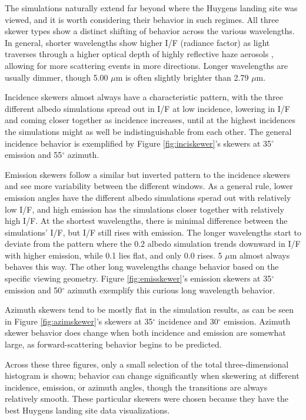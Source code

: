 \documentclass[twocolumn,linenumbers]{aastex631}
\begin{document}
The simulations naturally extend far beyond where the Huygens landing site was viewed, and it is worth considering their behavior in such regimes. All three skewer types show a distinct shifting of behavior across the various wavelengths. In general, shorter wavelengths show higher I/F (radiance factor) as light traverses through a higher optical depth of highly reflective haze aerosols \citep{EsSayeh2023}, allowing for more scattering events in more directions. Longer wavelengths are usually dimmer, though 5.00 $\mu$m is often slightly brighter than 2.79 $\mu$m.

Incidence skewers almost always have a characteristic pattern, with the three different albedo simulations spread out in I/F at low incidence, lowering in I/F and coming closer together as incidence increases, until at the highest incidences the simulations might as well be indistinguishable from each other. The general incidence behavior is exemplified by Figure \ref{fig:inciskewer}'s skewers at 35$^{\circ}$ emission and 55$^{\circ}$ azimuth.

Emission skewers follow a similar but inverted pattern to the incidence skewers and see more variability between the different windows. As a general rule, lower emission angles have the different albedo simulations sperad out with relatively low I/F, and high emission has the simulations closer together with relatively high I/F. At the shortest wavelengths, there is minimal difference between the simulations' I/F, but I/F still rises with emission. The longer wavelengths start to deviate from the pattern where the 0.2 albedo simulation trends downward in I/F with higher emission, while 0.1 lies flat, and only 0.0 rises. 5 $\mu$m almost always behaves this way. The other long wavelengths change behavior based on the specific viewing geometry. Figure \ref{fig:emisskewer}'s emission skewers at 35$^{\circ}$ emission and 50$^{\circ}$ azimuth exemplify this curious long wavelength behavior.

Azimuth skewers tend to be mostly flat in the simulation results, as can be seen in Figure \ref{fig:azimskewer}'s skewers at 35$^{\circ}$ incidence and 30$^{\circ}$ emission. Azimuth skewer behavior does change when both incidence and emission are somewhat large, as forward-scattering behavior begins to be predicted.

Across these three figures, only a small selection of the total three-dimensional histogram is shown; behavior can change significantly when skewering at different incidence, emission, or azimuth angles, though the transitions are always relatively smooth. These particular skewers were chosen because they have the best Huygens landing site data visualizations.
\end{document}
